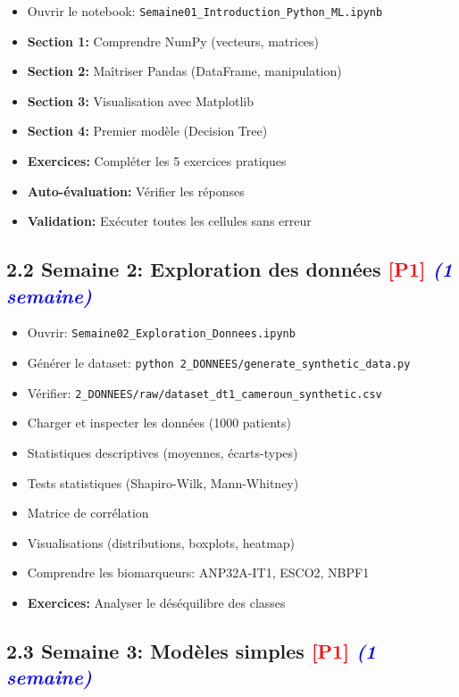 \documentclass[a4paper,11pt]{article}
\newcommand{\checkboxdone}{\large$\boxtimes$}
\newcommand{\priorite}[1]{\textcolor{red}{\textbf{[#1]}}}
\newcommand{\duree}[1]{\textcolor{blue}{\textit{(#1)}}}
\begin{document}
\begin{itemize}[label=\checkboxdone]
    \item Ouvrir le notebook: \texttt{Semaine01\_Introduction\_Python\_ML.ipynb}
    \item \textbf{Section 1:} Comprendre NumPy (vecteurs, matrices)
    \item \textbf{Section 2:} Maîtriser Pandas (DataFrame, manipulation)
    \item \textbf{Section 3:} Visualisation avec Matplotlib
    \item \textbf{Section 4:} Premier modèle (Decision Tree)
    \item \textbf{Exercices:} Compléter les 5 exercices pratiques
    \item \textbf{Auto-évaluation:} Vérifier les réponses
    \item \textbf{Validation:} Exécuter toutes les cellules sans erreur
\end{itemize}

\subsection*{2.2 Semaine 2: Exploration des données \priorite{P1} \duree{1 semaine}}

\begin{itemize}[label=\checkboxdone]
    \item Ouvrir: \texttt{Semaine02\_Exploration\_Donnees.ipynb}
    \item Générer le dataset: \texttt{python 2\_DONNEES/generate\_synthetic\_data.py}
    \item Vérifier: \texttt{2\_DONNEES/raw/dataset\_dt1\_cameroun\_synthetic.csv}
    \item Charger et inspecter les données (1000 patients)
    \item Statistiques descriptives (moyennes, écarts-types)
    \item Tests statistiques (Shapiro-Wilk, Mann-Whitney)
    \item Matrice de corrélation
    \item Visualisations (distributions, boxplots, heatmap)
    \item Comprendre les biomarqueurs: ANP32A-IT1, ESCO2, NBPF1
    \item \textbf{Exercices:} Analyser le déséquilibre des classes
\end{itemize}

\subsection*{2.3 Semaine 3: Modèles simples \priorite{P1} \duree{1 semaine}}
\end{document}
